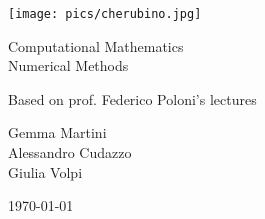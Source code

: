 \documentclass[ComputationalMathematics.tex]{subfiles}
\begin{document}
\begin{titlepage}
    \begin{center}
    \vspace{3cm}
    
    \Large
    
    \vspace{2cm}
    
    \texttt{[image: pics/cherubino.jpg]}
    
    \vspace{2.5cm}
    
    {\Huge \sc Computational Mathematics\\ Numerical Methods}
    
    \vspace{2cm}
    Based on prof. Federico Poloni's lectures
    
    \vspace{2cm}
    Gemma Martini\\ Alessandro Cudazzo\\ Giulia Volpi
    \vfill
    
    \today
    
    \end{center}
\end{titlepage}

\shipout\null

\tableofcontents
\let\tableofcontents\relax

\newpage



\newpage



\newpage



\newpage



\newpage



\newpage



\newpage



\newpage



\newpage



\newpage



\newpage



\newpage



\newpage



\newpage



\newpage



\newpage


\end{document}
